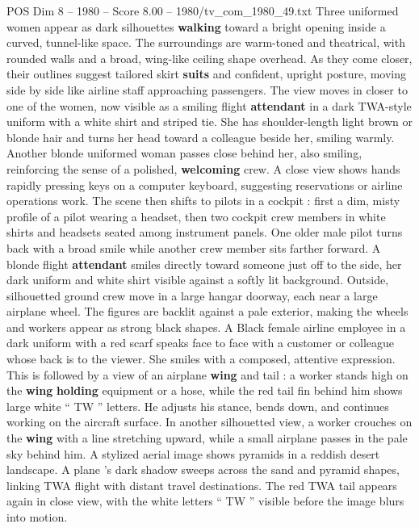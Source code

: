 \begin{textsample}{POS Dim 8 – 1980 – Score 8.00 – 1980/tv\_com\_1980\_49.txt}  \label{ex:f8_pos_043}
Three uniformed women appear as dark silhouettes \textbf{walking} toward a bright opening inside a curved, tunnel-like space.
The surroundings are warm-toned and theatrical, with rounded walls and a broad, wing-like ceiling shape overhead.
As they come closer, their outlines suggest tailored skirt \textbf{suits} and confident, upright posture, moving side by side like airline staff approaching passengers.
The view moves in closer to one of the women, now visible as a smiling flight \textbf{attendant} in a dark TWA-style uniform with a white shirt and striped tie.
She has shoulder-length light brown or blonde hair and turns her head toward a colleague beside her, smiling warmly.
Another blonde uniformed woman passes close behind her, also smiling, reinforcing the sense of a polished, \textbf{welcoming} crew.
A close view shows hands rapidly pressing keys on a computer keyboard, suggesting reservations or airline operations work.
The scene then shifts to pilots in a cockpit : first a dim, misty profile of a pilot wearing a headset, then two cockpit crew members in white shirts and headsets seated among instrument panels.
One older male pilot turns back with a broad smile while another crew member sits farther forward.
A blonde flight \textbf{attendant} smiles directly toward someone just off to the side, her dark uniform and white shirt visible against a softly lit background.
Outside, silhouetted ground crew move in a large hangar doorway, each near a large airplane wheel.
The figures are backlit against a pale exterior, making the wheels and workers appear as strong black shapes.
A Black female airline employee in a dark uniform with a red scarf speaks face to face with a customer or colleague whose back is to the viewer.
She smiles with a composed, attentive expression.
This is followed by a view of an airplane \textbf{wing} and tail : a worker stands high on the \textbf{wing} \textbf{holding} equipment or a hose, while the red tail fin behind him shows large white “ TW ” letters.
He adjusts his stance, bends down, and continues working on the aircraft surface.
In another silhouetted view, a worker crouches on the \textbf{wing} with a line stretching upward, while a small airplane passes in the pale sky behind him.
A stylized aerial image shows pyramids in a reddish desert landscape.
A plane ’s dark shadow sweeps across the sand and pyramid shapes, linking TWA flight with distant travel destinations.
The red TWA tail appears again in close view, with the white letters “ TW ” visible before the image blurs into motion.

\end{textsample}
